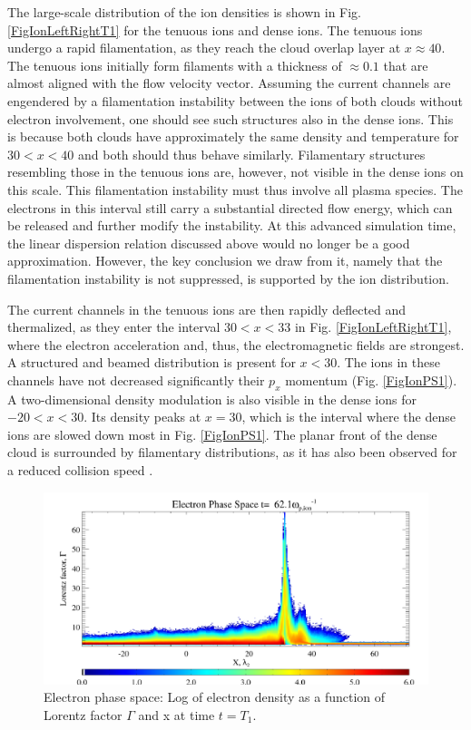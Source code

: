 \documentclass[structabstract]{aa}
\begin{document}
The large-scale distribution of the ion densities is shown in Fig. 
\ref{FigIonLeftRightT1} for the tenuous ions and dense ions. The tenuous ions 
undergo a rapid filamentation, as they reach the cloud overlap layer at 
$x\approx 40$. The tenuous ions initially form 
filaments with a thickness of $\approx 0.1$ that are almost aligned 
with the flow velocity vector. 
Assuming the current channels are engendered by
a filamentation instability between the ions of both clouds without electron 
involvement, one should see such structures also in the dense ions. 
This is because both clouds have approximately the same density and temperature for 
$30<x<40$ and both should thus behave similarly. 
Filamentary structures 
resembling those in the tenuous ions are, however, not visible in the dense 
ions on this scale. This filamentation instability must thus involve all 
plasma species. The electrons in this interval still carry a substantial 
directed flow energy, which can be released and further modify the instability. 
At this advanced simulation time, the linear dispersion relation discussed above would no longer be a good 
approximation. 
However, the key conclusion 
we draw from it, namely that the filamentation instability is not suppressed, 
is supported by the ion distribution.

The current channels in the tenuous ions are then rapidly deflected and 
thermalized, as they enter the interval $30<x<33$ in Fig. 
\ref{FigIonLeftRightT1}, 
where the electron acceleration and, thus, the electromagnetic fields are 
strongest. A structured and beamed distribution is present for $x<30$. The 
ions in these channels have not decreased significantly their $p_x$ momentum 
(Fig. \ref{FigIonPS1}). A two-dimensional density modulation is also visible 
in the dense ions for $-20<x<30$. Its density peaks at $x=30$, which is the 
interval where the dense ions are slowed down most in Fig. \ref{FigIonPS1}. 
The planar front of the dense cloud is surrounded by filamentary 
distributions, as it has also been observed for a reduced collision speed 
\citep{Dieckmann:2010qf}.

\begin{figure}
\centering
\includegraphics[width=\columnwidth]{15294f03.png}
\caption{Electron phase space: Log of electron density as a function of 
Lorentz factor $\Gamma$ and x at time $t=T_1$.}
\label{FigElecPS1}
\end{figure}
 
\end{document}
